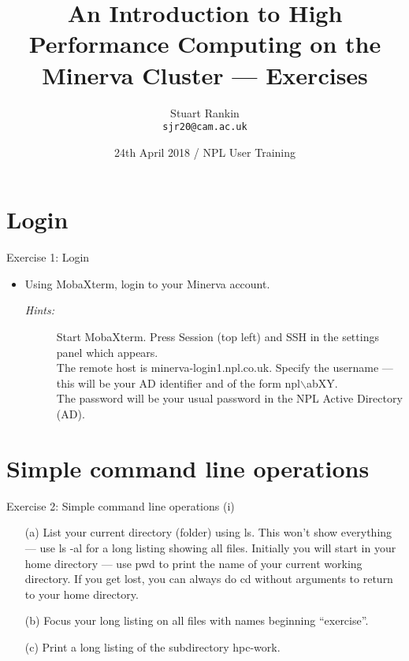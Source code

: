 \documentclass{beamer}
\title[An introduction to HPC on Minerva --- Exercises] %
{An Introduction to High Performance Computing on the Minerva Cluster --- Exercises}
\author[SJ Rankin] %
{Stuart Rankin\\ \texttt{sjr20@cam.ac.uk}}
\institute[UIS, University of Cambridge] %
{Research Computing Services (http://www.hpc.cam.ac.uk/)\\
University Information Services (http://www.uis.cam.ac.uk/)}
\date[24/04/2018] %
{24th April 2018 / NPL User Training}
\begin{document}
\begin{frame}
  \titlepage
\end{frame}

\section{Login}
\begin{frame}{Exercise 1: Login}
\begin{itemize}
\item{Using MobaXterm, login to your Minerva account.}
\begin{description}
\item[\emph{Hints:}]{\small Start MobaXterm. Press \alert{Session} (top left) and \alert{SSH} in the settings panel which appears.\\\smallskip
The remote host is \alert{minerva-login1.npl.co.uk}. Specify the username --- this will be your AD identifier and of the form \alert{npl$\backslash$abXY}.\hfill\\\smallskip
\smallskip
The password will be your usual password in the NPL Active Directory (AD).}
\end{description}
\end{itemize}
\end{frame}

\section{Simple command line operations}
\begin{frame}{Exercise 2: Simple command line operations (i)}
\begin{itemize}

\item[(a)]{List your current directory (folder) using \alert{ls}. This won't show everything --- use \alert{ls -al} for a long listing showing all files. Initially you will start in your home directory --- use \alert{pwd} to print the name of your current working directory. If you get lost, you can always do \alert{cd} without arguments to return to your home directory.}

\item[(b)]{Focus your long listing on \alert{all files with names beginning ``exercise''}.}

\item[(c)]{Print a long listing of the subdirectory \alert{hpc-work}.}

\end{itemize}
\end{frame}
\end{document}
